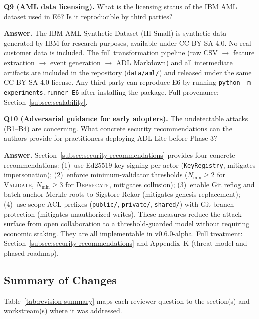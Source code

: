 \textbf{Q9 (AML data licensing).} What is the licensing status of the IBM AML dataset used in E6? Is it reproducible by third parties?

\textbf{Answer.} The IBM AML Synthetic Dataset (HI-Small) is synthetic data generated by IBM for research purposes, available under CC-BY-SA 4.0. No real customer data is included. The full transformation pipeline (raw CSV $\rightarrow$ feature extraction $\rightarrow$ event generation $\rightarrow$ ADL Markdown) and all intermediate artifacts are included in the repository (\texttt{data/aml/}) and released under the same CC-BY-SA 4.0 license. Any third party can reproduce E6 by running \texttt{python -m experiments.runner E6} after installing the package. Full provenance: Section~\ref{subsec:scalability}.

\textbf{Q10 (Adversarial guidance for early adopters).} The undetectable attacks (B1--B4) are concerning. What concrete security recommendations can the authors provide for practitioners deploying ADL Lite before Phase 3?

\textbf{Answer.} Section~\ref{subsec:security-recommendations} provides four concrete recommendations: (1)~use Ed25519 key signing per actor (\texttt{KeyRegistry}, mitigates impersonation); (2)~enforce minimum-validator thresholds ($N_{\min} \geq 2$ for \textsc{Validate}, $N_{\min} \geq 3$ for \textsc{Deprecate}, mitigates collusion); (3)~enable Git reflog and batch-anchor Merkle roots to Sigstore Rekor (mitigates genesis replacement); (4)~use scope ACL prefixes (\texttt{public/}, \texttt{private/}, \texttt{shared/}) with Git branch protection (mitigates unauthorized writes). These measures reduce the attack surface from open collaboration to a threshold-guarded model without requiring economic staking. They are all implementable in v0.6.0-alpha. Full treatment: Section~\ref{subsec:security-recommendations} and Appendix~K (threat model and phased roadmap).

\subsection{Summary of Changes}\label{subsec:response-summary}

Table~\ref{tab:revision-summary} maps each reviewer question to the section(s) and workstream(s) where it was addressed.

